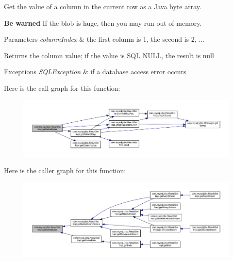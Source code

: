 Get the value of a column in the current row as a Java byte array.

{\bfseries Be warned} If the blob is huge, then you may run out of memory. 


\begin{DoxyParams}{Parameters}
{\em column\+Index} & the first column is 1, the second is 2, ...\\
\hline
\end{DoxyParams}
\begin{DoxyReturn}{Returns}
the column value; if the value is S\+QL N\+U\+LL, the result is null
\end{DoxyReturn}

\begin{DoxyExceptions}{Exceptions}
{\em S\+Q\+L\+Exception} & if a database access error occurs \\
\hline
\end{DoxyExceptions}
Here is the call graph for this function\+:
\nopagebreak
\begin{figure}[H]
\begin{center}
\leavevmode
\includegraphics[width=350pt]{classcom_1_1mysql_1_1jdbc_1_1_result_set_impl_abd4834b44508518bbd8c292a951772d5_cgraph}
\end{center}
\end{figure}
Here is the caller graph for this function\+:
\nopagebreak
\begin{figure}[H]
\begin{center}
\leavevmode
\includegraphics[width=350pt]{classcom_1_1mysql_1_1jdbc_1_1_result_set_impl_abd4834b44508518bbd8c292a951772d5_icgraph}
\end{center}
\end{figure}
\mbox{\label{classcom_1_1mysql_1_1jdbc_1_1_result_set_impl_aa4b4211a652d497532ff8e857c0cb7a5}} 
